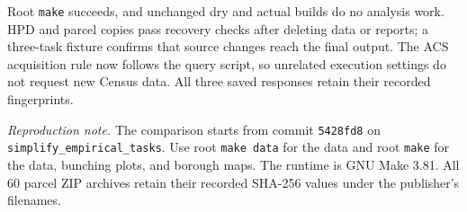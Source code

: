 Root \texttt{make} succeeds, and unchanged dry and actual builds do no analysis
work. HPD and parcel copies pass recovery checks after deleting data or reports;
a three-task fixture confirms that source changes reach the final output.
The ACS acquisition rule now follows the query script, so unrelated execution
settings do not request new Census data. All three saved responses retain their
recorded fingerprints.

\textit{Reproduction note.} The comparison starts from commit
\texttt{5428fd8} on \texttt{simplify\_empirical\_tasks}. Use root
\texttt{make data} for the data and root \texttt{make} for the data, bunching
plots, and borough maps. The runtime is GNU Make 3.81. All 60 parcel ZIP
archives retain their recorded SHA-256 values under the publisher's filenames.
